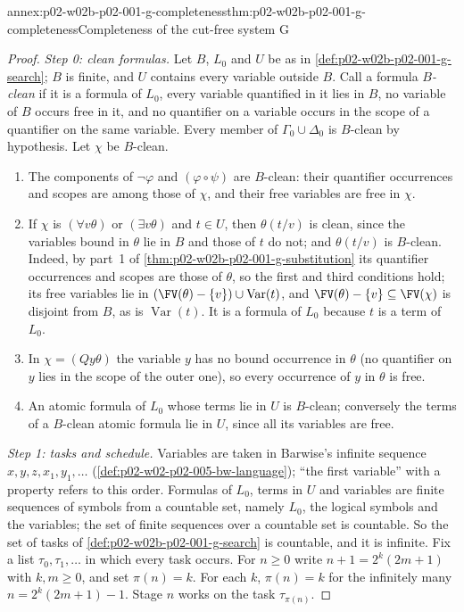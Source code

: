 \begin{annexitem}{annex:p02-w02b-p02-001-g-completeness}{thm:p02-w02b-p02-001-g-completeness}{Completeness of the cut-free system G}
\begin{proof}
\emph{Step 0: clean formulas.}  Let \(B\), \(L_0\) and \(U\) be as in
\cref{def:p02-w02b-p02-001-g-search}; \(B\) is finite, and \(U\) contains
every variable outside \(B\).  Call a formula \emph{\(B\)-clean} if it is a
formula of \(L_0\), every variable quantified in it lies in \(B\), no
variable of \(B\) occurs free in it, and no quantifier on a variable occurs
in the scope of a quantifier on the same variable.  Every member of
\(\Gamma_0\cup\Delta_0\) is \(B\)-clean by hypothesis.  Let \(\chi\) be
\(B\)-clean.
\begin{enumerate}
\item[(i)] The components of \(\neg\varphi\) and \((\varphi\circ\psi)\) are
      \(B\)-clean: their quantifier occurrences and scopes are among those
      of \(\chi\), and their free variables are free in \(\chi\).
\item[(ii)] If \(\chi\) is \((\forall v\theta)\) or \((\exists v\theta)\)
      and \(t\in U\), then \(\theta(t/v)\) is clean, since the variables
      bound in \(\theta\) lie in \(B\) and those of \(t\) do not; and
      \(\theta(t/v)\) is \(B\)-clean.  Indeed, by part~1 of
      \cref{thm:p02-w02b-p02-001-g-substitution} its quantifier occurrences
      and scopes are those of \(\theta\), so the first and third conditions
      hold; its free variables lie in
      \((\FV(\theta)-\{v\})\cup\operatorname{Var}(t)\), and
      \(\FV(\theta)-\{v\}\subseteq\FV(\chi)\) is disjoint from \(B\), as is
      \(\operatorname{Var}(t)\).  It is a formula of \(L_0\) because \(t\)
      is a term of \(L_0\).
\item[(iii)] In \(\chi=(Qy\theta)\) the variable \(y\) has no bound
      occurrence in \(\theta\) (no quantifier on \(y\) lies in the scope of
      the outer one), so every occurrence of \(y\) in \(\theta\) is free.
\item[(iv)] An atomic formula of \(L_0\) whose terms lie in \(U\) is
      \(B\)-clean; conversely the terms of a \(B\)-clean atomic formula lie
      in \(U\), since all its variables are free.
\end{enumerate}

\emph{Step 1: tasks and schedule.}  Variables are taken in Barwise's
infinite sequence \(x,y,z,x_1,y_1,\ldots\)
(\cref{def:p02-w02-p02-005-bw-language}); ``the first variable'' with a
property refers to this order.  Formulas of \(L_0\), terms in \(U\) and
variables are finite sequences of symbols from a countable set, namely
\(L_0\), the logical symbols and the variables; the set of finite
sequences over a countable set is countable.  So the set of tasks of
\cref{def:p02-w02b-p02-001-g-search} is countable, and it is infinite.  Fix
a list \(\tau_0,\tau_1,\ldots\) in which every task occurs.  For
\(n\geq0\) write \(n+1=2^{k}(2m+1)\) with \(k,m\geq0\), and set
\(\pi(n)=k\).  For each \(k\), \(\pi(n)=k\) for the infinitely many
\(n=2^{k}(2m+1)-1\).  Stage \(n\) works on the task \(\tau_{\pi(n)}\).


\end{proof}
\end{annexitem}
